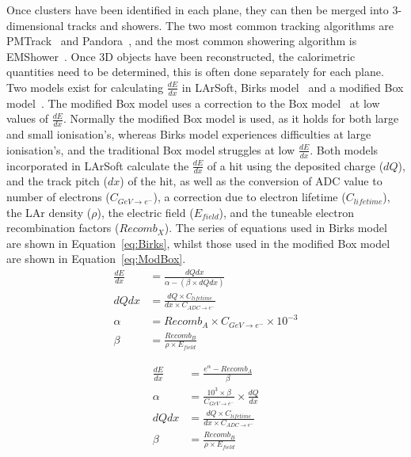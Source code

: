Once clusters have been identified in each plane, they can then be merged into 3-dimensional tracks and showers. The two most common tracking algorithms are PMTrack~\citep{PMTrack} and Pandora~\citep{Pandora}, and the most common showering algorithm is EMShower~\citep{EMShower}. Once 3D objects have been reconstructed, the calorimetric quantities need to be determined, this is often done separately for each plane. Two models exist for calculating $\frac{dE}{dx}$ in LArSoft, Birks model~\citep{BirksModel} and a modified Box model~\citep{PIDA_Paper}. The modified Box model uses a correction to the Box model~\citep{BoxModel} at low values of $\frac{dE}{dx}$. Normally the modified Box model is used, as it holds for both large and small ionisation's, whereas Birks model experiences difficulties at large ionisation's, and the traditional Box model struggles at low $\frac{dE}{dx}$. Both models incorporated in LArSoft calculate the $\frac{dE}{dx}$ of a hit using the deposited charge ($dQ$), and the track pitch ($dx$) of the hit, as well as the conversion of ADC value to number of electrons ($C_{GeV \rightarrow e^{-}}$), a correction due to electron lifetime ($C_{lifetime}$), the LAr density ($\rho$), the electric field ($E_{field}$), and the tuneable electron recombination factors ($Recomb_{X}$). The series of equations used in Birks model are shown in Equation~\ref{eq:Birks}, whilst those used in the modified Box model are shown in Equation~\ref{eq:ModBox}. \\

\begin{subequations}
  \label{eq:Birks}
  \begin{align}
    \frac{dE}{dx} &= \frac{ dQdx }{ \alpha - (\beta \times dQdx) } \label{eq:Birks_1} \\
    dQdx &= \frac{ dQ \times C_{lifetime} }{ dx \times C_{ADC \rightarrow e^{-}} } \label{eq:Birks_Correc} \\
    \alpha &= Recomb_{A} \times C_{GeV \rightarrow e^{-}} \times 10^{-3} \label{eq:Birks_A}\\
    \beta  &= \frac{ Recomb_{B} }{ \rho \times E_{field} } \label{eq:Birks_B}
  \end{align}
\end{subequations}

\begin{subequations}
  \label{eq:ModBox}
  \begin{align}
    \frac{dE}{dx} &= \frac{ e^{\alpha} - Recomb_{A} }{ \beta } \label{eq:ModBox_1} \\
    \alpha &= \frac{10^3 \times \beta }{ C_{GeV \rightarrow e^{-} } } \times \frac{dQ}{dx} \label{eq:ModBox_A}\\
    dQdx &= \frac{ dQ \times C_{lifetime} }{ dx \times C_{ADC \rightarrow e^{-}} } \label{eq:ModBox_Correc} \\
    \beta &= \frac{ Recomb_{B} }{ \rho \times E_{field} } \label{eq:ModBox_B}
  \end{align}
\end{subequations}

